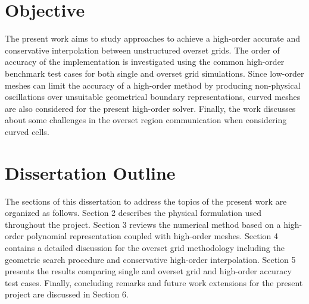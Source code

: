 \section{Objective}
The present work aims to study approaches to achieve a high-order accurate and conservative interpolation between unstructured overset grids. The order of accuracy of the implementation is investigated using the common high-order benchmark test cases for both single and overset grid simulations. Since low-order meshes can limit the accuracy of a high-order method by producing non-physical oscillations over unsuitable geometrical boundary representations, curved meshes are also considered for the present high-order solver. Finally, the work discusses about some challenges in the overset region communication when considering curved cells.

\section{Dissertation Outline}
The sections of this dissertation to address the topics of the present work are organized as follows. Section 2 describes the physical formulation used throughout the project. Section 3 reviews the numerical method based on a high-order polynomial representation coupled with high-order meshes. Section 4 contains a detailed discussion for the overset grid methodology including the geometric search procedure and conservative high-order interpolation. Section 5 presents the results comparing single and overset grid and high-order accuracy test cases. Finally, concluding remarks and future work extensions for the present project are discussed in Section 6.